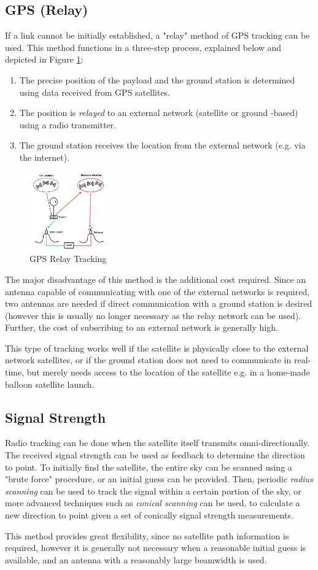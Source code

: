 \subsection{GPS (Relay)}
If a link cannot be initially established, a "relay" method of GPS tracking can be used. This method functions in a three-step process, explained below and depicted in Figure \ref{fig:gps_relay}:
\begin{enumerate}
    \item The precise position of the payload and the ground station is determined using data received from GPS satellites.
    \item The position is \textit{relayed} to an external network (satellite or ground -based) using a radio transmitter.
    \item The ground station receives the location from the external network (e.g. via the internet).
\end{enumerate}

\begin{figure}[!htb]
  \centering
  \includegraphics[width=0.3\textwidth]{gps_relay}
  \caption{GPS Relay Tracking \cite{site-highaltitudescienceTrackingWeather}}
  \label{fig:gps_relay}
\end{figure}

The major disadvantage of this method is the additional cost required. Since an antenna capable of communicating with one of the external networks is required, two antennas are needed if direct communication with a ground station is desired (however this is usually no longer necessary as the relay network can be used). Further, the cost of subscribing to an external network is generally high.

This type of tracking works well if the satellite is physically close to the external network satellites, or if the ground station does not need to communicate in real-time, but merely needs access to the location of the satellite e.g. in a home-made balloon satellite launch.

\subsection{Signal Strength}
Radio tracking can be done when the satellite itself transmits omni-directionally. The received signal strength can be used as feedback to determine the direction to point. To initially find the satellite, the entire sky can be scanned using a "brute force" procedure, or an initial guess can be provided. Then, periodic \textit{radius scanning} can be used to track the signal within a certain portion of the sky, or more advanced techniques such as \textit{conical scanning} can be used, to calculate a new direction to point given a set of conically signal strength measurements.

This method provides great flexibility, since no satellite path information is required, however it is generally not necessary when a reasonable initial guess is available, and an antenna with a reasonably large beamwidth is used.